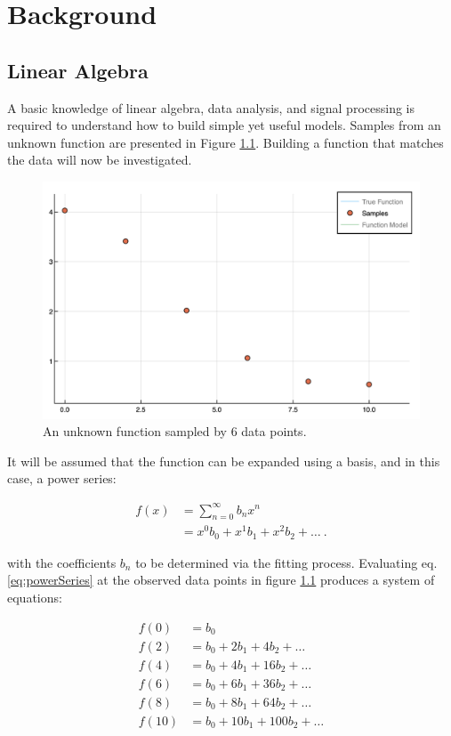 \chapter{Background}\label{Sect:background}
\section{Linear Algebra}\label{Sect:linearAlgebra}
A basic knowledge of linear algebra, data analysis, and signal processing is required to understand how to build simple yet useful models. Samples from an unknown function are presented in Figure \ref{fig:func1Samples}. Building a function that matches the data will now be investigated.

\begin{figure}%
\centering
\includegraphics[scale = 0.5]{Figures/func1Samples}
\caption{An unknown function sampled by 6 data points.
\label{fig:func1Samples}} 
\end{figure}

\par It will be assumed that the function can be expanded using a basis, and in this case, a power series:

\begin{align}
f(x) &= \sum_{n=0}^\infty b_n x^n
	\label{eq:powerSum}\\ 
&= x^0b_0 + x^1b_1 + x^2b_2 + \ldots\ .
	\label{eq:powerSeries}
\end{align}

with the coefficients $b_n$ to be determined via the fitting process. Evaluating eq. \ref{eq:powerSeries} at the observed data points in figure \ref{fig:func1Samples} produces a system of equations:

\begin{align}
f(0) &= b_0 \nonumber \\
f(2) &= b_0 + 2 b_1 + 4 b_2 + \dots \nonumber \\
f(4) &= b_0 + 4 b_1 + 16 b_2 + \dots \nonumber \\
f(6) &= b_0 + 6 b_1 + 36 b_2 + \dots \nonumber \\
f(8) &= b_0 + 8 b_1 + 64 b_2 + \dots \nonumber \\
f(10) &= b_0 + 10 b_1 + 100 b_2 + \dots\\
\end{align}

